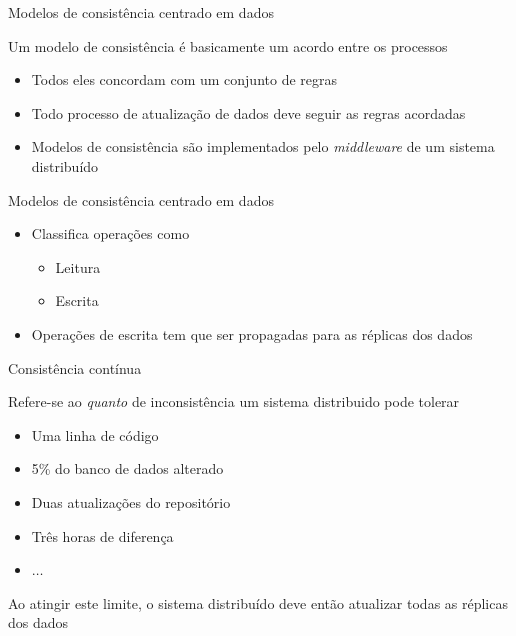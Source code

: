 \documentclass[compress]{beamer}
\begin{document}

\begin{frame}{Modelos de consistência centrado em dados}

Um modelo de consistência é basicamente um acordo entre os processos
\begin{itemize}
    \item Todos eles concordam com um conjunto de regras
    \item Todo processo de atualização de dados deve seguir as regras acordadas
    \item Modelos de consistência são implementados pelo \textit{middleware} de um sistema distribuído
\end{itemize}

Modelos de consistência centrado em dados
\begin{itemize}
    \item Classifica operações como 
    \begin{itemize}
        \item Leitura
        \item Escrita
    \end{itemize}
    \item Operações de escrita tem que ser propagadas para as réplicas dos dados
\end{itemize}
\end{frame}


\begin{frame}{Consistência contínua}

Refere-se ao \textit{quanto} de inconsistência um sistema distribuido pode tolerar
\begin{itemize}
    \item Uma linha de código
    \item 5\% do banco de dados alterado
    \item Duas atualizações do repositório
    \item Três horas de diferença
    \item $\ldots$
\end{itemize}

\vspace{0.5cm}

Ao atingir este limite, o sistema distribuído deve então atualizar todas as réplicas dos dados

\end{frame}
\end{document}
